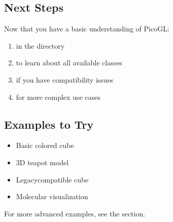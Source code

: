 \documentclass[a4paper,10pt,english,openany,oneside]{sphinxmanual}
\begin{document}
\subsection{Next Steps}
\label{\detokenize{quickstart:next-steps}}
\sphinxAtStartPar
Now that you have a basic understanding of PicoGL:
\begin{enumerate}
%
\item {} 
\sphinxAtStartPar
{} in the  directory

\item {} 
\sphinxAtStartPar
{} to learn about all available classes

\item {} 
\sphinxAtStartPar
{} if you have compatibility issues

\item {} 
\sphinxAtStartPar
{} for more complex use cases

\end{enumerate}


\subsection{Examples to Try}
\label{\detokenize{quickstart:examples-to-try}}\begin{itemize}
\item {} 
\sphinxAtStartPar
{} \sphinxhyphen{} Basic colored cube

\item {} 
\sphinxAtStartPar
{} \sphinxhyphen{} 3D teapot model

\item {} 
\sphinxAtStartPar
{} \sphinxhyphen{} Legacy\sphinxhyphen{}compatible cube

\item {} 
\sphinxAtStartPar
{} \sphinxhyphen{} Molecular visualization

\end{itemize}

\sphinxAtStartPar
For more advanced examples, see the {\hyperref[\detokenize{examples::doc}]{}} section.
\end{document}

